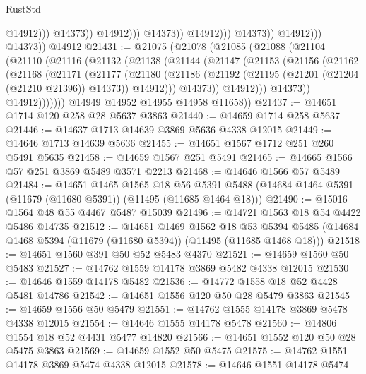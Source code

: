 \begin{lexlean}{RustStd}
\begin{coremodule}
                                            @14912)))
                                      @14373))
                                  @14912)))
                            @14373))
                        @14912)))
                  @14373))
              @14912)))
        @14373))
    @14912
@21431 := @21075
    (@21078
      (@21085
        (@21088
          (@21104
            (@21110
              (@21116
                (@21132
                  (@21138
                    (@21144
                      (@21147
                        (@21153
                          (@21156
                            (@21162
                              (@21168
                                (@21171
                                  (@21177
                                    (@21180
                                      (@21186
                                        (@21192
                                          (@21195 (@21201 (@21204 (@21210 @21396)) @14373))
                                          @14912)))
                                    @14373))
                                @14912)))
                          @14373))
                      @14912)))))))
        @14949
        @14952
        @14955
        @14958
        @11658))
@21437 := @14651 @1714 @120 @258 @28 @5637 @3863
@21440 := @14659 @1714 @258 @5637
@21446 := @14637 @1713 @14639 @3869 @5636 @4338 @12015
@21449 := @14646 @1713 @14639 @5636
@21455 := @14651 @1567 @1712 @251 @260 @5491 @5635
@21458 := @14659 @1567 @251 @5491
@21465 := @14665 @1566 @57 @251 @3869 @5489 @3571 @2213
@21468 := @14646 @1566 @57 @5489
@21484 := @14651
    @1465
    @1565
    @18
    @56
    @5391
    @5488
    (@14684 @1464 @5391 (@11679 (@11680 @5391)) (@11495 (@11685 @1464 @18)))
@21490 := @15016 @1564 @48 @55 @4467 @5487 @15039
@21496 := @14721 @1563 @18 @54 @4422 @5486 @14735
@21512 := @14651
    @1469
    @1562
    @18
    @53
    @5394
    @5485
    (@14684 @1468 @5394 (@11679 (@11680 @5394)) (@11495 (@11685 @1468 @18)))
@21518 := @14651 @1560 @391 @50 @52 @5483 @4370
@21521 := @14659 @1560 @50 @5483
@21527 := @14762 @1559 @14178 @3869 @5482 @4338 @12015
@21530 := @14646 @1559 @14178 @5482
@21536 := @14772 @1558 @18 @52 @4428 @5481 @14786
@21542 := @14651 @1556 @120 @50 @28 @5479 @3863
@21545 := @14659 @1556 @50 @5479
@21551 := @14762 @1555 @14178 @3869 @5478 @4338 @12015
@21554 := @14646 @1555 @14178 @5478
@21560 := @14806 @1554 @18 @52 @4431 @5477 @14820
@21566 := @14651 @1552 @120 @50 @28 @5475 @3863
@21569 := @14659 @1552 @50 @5475
@21575 := @14762 @1551 @14178 @3869 @5474 @4338 @12015
@21578 := @14646 @1551 @14178 @5474

\end{coremodule}
\end{lexlean}

